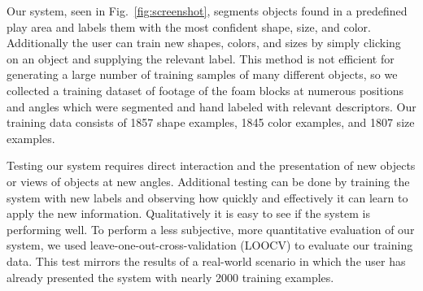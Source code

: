 \documentclass[11pt]{article}
\begin{document}
Our system, seen in Fig.~\ref{fig:screenshot}, segments objects found in a
predefined play area and labels them with the most confident shape, size, and
color.  Additionally the user can train new shapes, colors, and sizes by simply
clicking on an object and supplying the relevant label. This method is not
efficient for generating a
large number of training samples of many different objects, so we collected a
training dataset of footage of the foam blocks at numerous positions and angles
which were segmented and hand labeled with relevant
descriptors. Our training data consists of 1857 shape examples, 1845 color
examples, and 1807 size examples.

\begin{figure}[h!]
\centering
{}
\caption{}
\label{fig:objects}
\end{figure}

Testing our system requires direct interaction and the presentation of new objects
or views of objects at new angles. Additional testing can be done by training the
system with new labels and observing how quickly and effectively it
can learn to apply the new information. Qualitatively it is easy to see
if the system is performing well. To perform a less subjective, more quantitative
evaluation of our system, we used leave-one-out-cross-validation (LOOCV) to
evaluate our training data. This test mirrors the results of a real-world
scenario in which the user has already presented the system with nearly 2000 training
examples.
\end{document}

